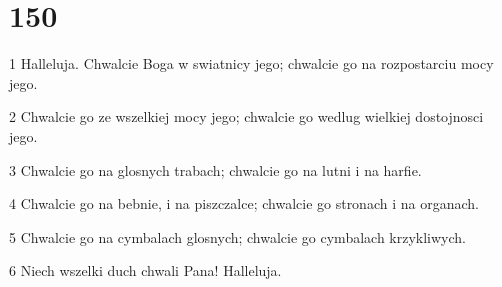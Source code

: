 \chapter{150}

\par 1 Halleluja. Chwalcie Boga w swiatnicy jego; chwalcie go na rozpostarciu mocy jego.
\par 2 Chwalcie go ze wszelkiej mocy jego; chwalcie go wedlug wielkiej dostojnosci jego.
\par 3 Chwalcie go na glosnych trabach; chwalcie go na lutni i na harfie.
\par 4 Chwalcie go na bebnie, i na piszczalce; chwalcie go stronach i na organach.
\par 5 Chwalcie go na cymbalach glosnych; chwalcie go cymbalach krzykliwych.
\par 6 Niech wszelki duch chwali Pana! Halleluja.


